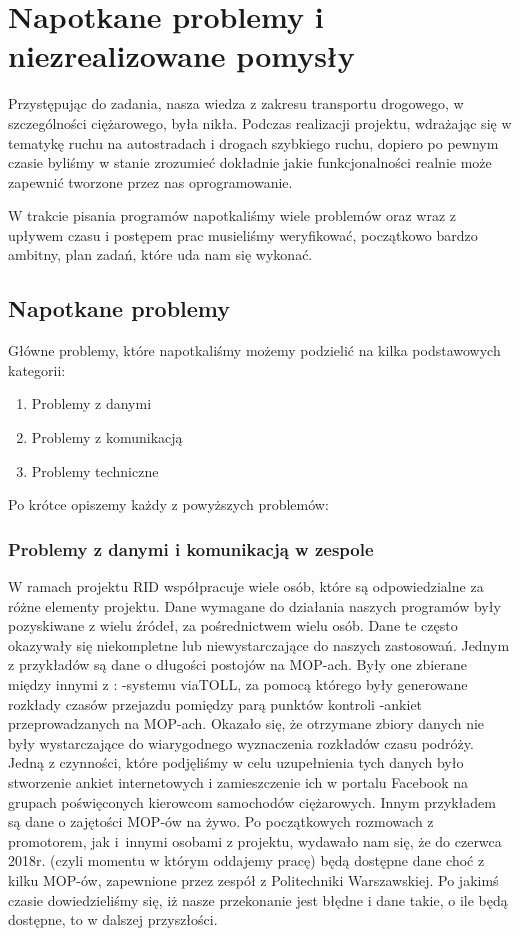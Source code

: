 \chapter{Napotkane problemy i niezrealizowane pomysły}

Przystępując do zadania, nasza wiedza z zakresu transportu drogowego, w szczególności ciężarowego, była nikła. Podczas realizacji projektu, wdrażając się  w tematykę ruchu na autostradach i drogach szybkiego ruchu, dopiero po pewnym czasie byliśmy w stanie zrozumieć dokładnie jakie funkcjonalności realnie może zapewnić tworzone przez nas oprogramowanie.

W trakcie pisania programów napotkaliśmy wiele problemów oraz wraz z upływem czasu i postępem prac musieliśmy weryfikować, początkowo bardzo ambitny, plan zadań, które uda nam się wykonać.

\section{Napotkane problemy}
Główne problemy, które napotkaliśmy możemy podzielić na kilka podstawowych kategorii:
\begin{enumerate}
\item Problemy z danymi
\item Problemy z komunikacją
\item Problemy techniczne
\end{enumerate}
Po krótce opiszemy każdy z powyższych problemów:
\subsection{Problemy z danymi i komunikacją w zespole}
W ramach projektu RID współpracuje wiele osób, które są odpowiedzialne za różne elementy projektu. 
Dane wymagane do działania naszych programów były pozyskiwane z wielu źródeł, za pośrednictwem wielu osób. Dane te często okazywały się niekompletne lub niewystarczające do naszych zastosowań.
Jednym z przykładów są dane o długości postojów na MOP-ach. Były one zbierane między innymi z :
-systemu viaTOLL, za pomocą którego były generowane rozkłady czasów przejazdu pomiędzy parą punktów kontroli
-ankiet przeprowadzanych na MOP-ach. 
Okazało się, że otrzymane zbiory danych nie były wystarczające do wiarygodnego wyznaczenia rozkładów czasu podróży. Jedną z czynności, które podjęliśmy w celu uzupełnienia tych danych było stworzenie ankiet internetowych i zamieszczenie ich w portalu Facebook na grupach poświęconych kierowcom samochodów ciężarowych.
Innym przykładem są dane o zajętości MOP-ów na żywo. Po początkowych rozmowach z promotorem, jak i~innymi osobami z projektu, wydawało nam się, że do czerwca 2018r. (czyli momentu w którym oddajemy pracę) będą dostępne dane choć z kilku MOP-ów, zapewnione przez zespół z Politechniki Warszawskiej. Po jakimś czasie dowiedzieliśmy się, iż nasze przekonanie jest błędne i dane takie, o ile będą dostępne, to w dalszej przyszłości.
